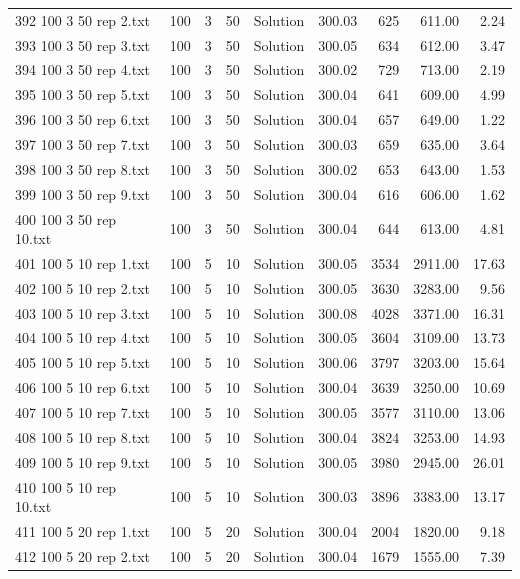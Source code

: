 \begin{longtable}{lrrllrrrr}
392 100 3 50 rep 2.txt & 100 & 3 & 50 & Solution & 300.03 & 625 & 611.00 &  2.24\\
393 100 3 50 rep 3.txt & 100 & 3 & 50 & Solution & 300.05 & 634 & 612.00 &  3.47\\
394 100 3 50 rep 4.txt & 100 & 3 & 50 & Solution & 300.02 & 729 & 713.00 &  2.19\\
395 100 3 50 rep 5.txt & 100 & 3 & 50 & Solution & 300.04 & 641 & 609.00 &  4.99\\
396 100 3 50 rep 6.txt & 100 & 3 & 50 & Solution & 300.04 & 657 & 649.00 &  1.22\\
397 100 3 50 rep 7.txt & 100 & 3 & 50 & Solution & 300.03 & 659 & 635.00 &  3.64\\
398 100 3 50 rep 8.txt & 100 & 3 & 50 & Solution & 300.02 & 653 & 643.00 &  1.53\\
399 100 3 50 rep 9.txt & 100 & 3 & 50 & Solution & 300.04 & 616 & 606.00 &  1.62\\
400 100 3 50 rep 10.txt & 100 & 3 & 50 & Solution & 300.04 & 644 & 613.00 &  4.81\\
401 100 5 10 rep 1.txt & 100 & 5 & 10 & Solution & 300.05 & 3534 & 2911.00 & 17.63\\
402 100 5 10 rep 2.txt & 100 & 5 & 10 & Solution & 300.05 & 3630 & 3283.00 &  9.56\\
403 100 5 10 rep 3.txt & 100 & 5 & 10 & Solution & 300.08 & 4028 & 3371.00 & 16.31\\
404 100 5 10 rep 4.txt & 100 & 5 & 10 & Solution & 300.05 & 3604 & 3109.00 & 13.73\\
405 100 5 10 rep 5.txt & 100 & 5 & 10 & Solution & 300.06 & 3797 & 3203.00 & 15.64\\
406 100 5 10 rep 6.txt & 100 & 5 & 10 & Solution & 300.04 & 3639 & 3250.00 & 10.69\\
407 100 5 10 rep 7.txt & 100 & 5 & 10 & Solution & 300.05 & 3577 & 3110.00 & 13.06\\
408 100 5 10 rep 8.txt & 100 & 5 & 10 & Solution & 300.04 & 3824 & 3253.00 & 14.93\\
409 100 5 10 rep 9.txt & 100 & 5 & 10 & Solution & 300.05 & 3980 & 2945.00 & 26.01\\
410 100 5 10 rep 10.txt & 100 & 5 & 10 & Solution & 300.03 & 3896 & 3383.00 & 13.17\\
411 100 5 20 rep 1.txt & 100 & 5 & 20 & Solution & 300.04 & 2004 & 1820.00 &  9.18\\
412 100 5 20 rep 2.txt & 100 & 5 & 20 & Solution & 300.04 & 1679 & 1555.00 &  7.39\\

\end{longtable}
